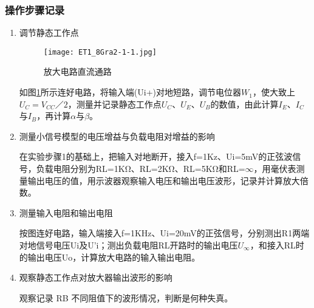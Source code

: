 \documentclass[dvipsnames, svgnames,a4paper,11pt]{article}
\begin{document}
	\subsubsection{操作步骤记录}
	\begin{enumerate}
		\item 调节静态工作点
		
		\begin{figure}[htbp]
			\centering
			\texttt{[image: ET1\_8Gra2-1-1.jpg]}
			\caption{放大电路直流通路}
			\label{fig:ET1_8Gra2-1-1}
		\end{figure}

		如图\cref{fig:ET1_8Gra2-1-1}所示连好电路，将输入端(Ui+)对地短路，调节电位器$W_1$，使大致上$U_C=V_{CC}／2$，测量并记录静态工作点$U_C$、$U_E$、$U_B$的数值，由此计算$I_E$、$I_C$与$I_B$，再计算$\alpha$与$\beta$。
		
		\item 测量小信号模型的电压增益与负载电阻对增益的影响
		
		在实验步骤1的基础上，把输入对地断开，接入f=1Kz、Ui=5mV的正弦波信号，负载电阻分别为RL=1KΩ、RL=2KΩ、RL=5KΩ和RL=$\infty$，用毫伏表测量输出电压的值，用示波器观察输入电压和输出电压波形，记录并计算放大倍数。
		
		\item 测量输入电阻和输出电阻
		
		按图连好电路，输入端接入f=1KHz、Ui=20mV的正弦信号，分别测出R1两端对地信号电压Ui及U’i；测出负载电阻RL开路时的输出电压$U_{\infty}$，和接入RL时的输出电压Uo，计算放大电路的输入输出电阻。
		
		\item 观察静态工作点对放大器输出波形的影响
		
		观察记录 RB 不同阻值下的波形情况，判断是何种失真。
	\end{enumerate}	
	
\end{document}
